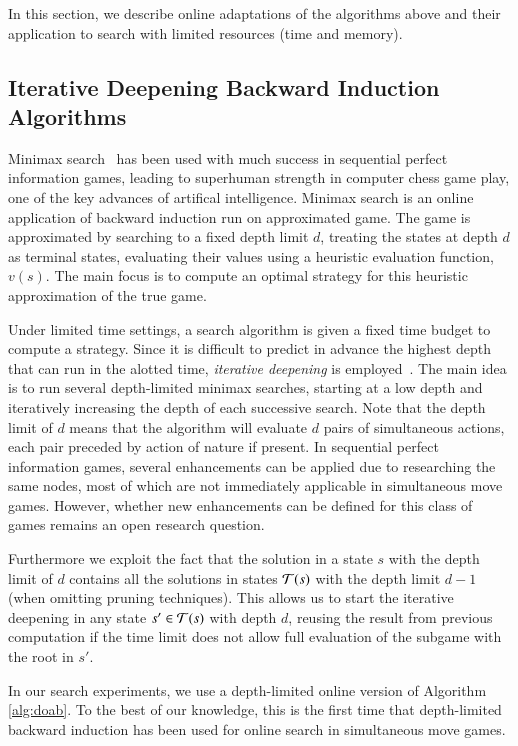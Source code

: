 
In this section, we describe online adaptations of the algorithms above and their application 
to search with limited resources (time and memory). 

\subsection{Iterative Deepening Backward Induction Algorithms} \label{sec:idbi}

Minimax search~\cite{AIbook} has been used with much success in sequential perfect information games, 
leading to superhuman strength in computer chess game play, one of the key advances of artifical 
intelligence. 
Minimax search is an online application of backward induction run on approximated game. 
The game is approximated by searching to a fixed depth limit $d$, treating the states at depth $d$
as terminal states, evaluating their values using a heuristic evaluation function, $v(s)$. 
The main focus is to compute an optimal strategy for this heuristic approximation of the true game. 

Under limited time settings, a search algorithm is given a fixed time budget to compute a strategy. 
Since it is difficult to predict in advance the highest depth that can run in the alotted time, 
{\it iterative deepening} is employed~\cite{Marsland83}. The main idea is to run several depth-limited 
minimax searches, starting at a low depth and iteratively increasing the depth of each successive search. Note that the depth limit of $d$ means that the algorithm will evaluate $d$ pairs of simultaneous actions, each pair preceded by action of nature if present.  
In sequential perfect information games, several enhancements can be applied due to researching the same 
nodes, most of which are not immediately applicable in simultaneous move games. However, whether new 
enhancements can be defined for this class of games remains an open research question. 

Furthermore we exploit the fact that the solution in a state $s$ with the depth limit of $d$ contains all the solutions in states $\mathcal{T}(s)$ with the depth limit $d - 1$ (when omitting pruning techniques). This allows us to start the iterative deepening in any state $s' \in \mathcal{T}(s)$ with depth $d$, reusing the result from previous computation if the time limit does not allow full evaluation of the subgame with the root in $s'$. 

In our search experiments, we use a depth-limited online version of Algorithm \ref{alg:doab}. To the 
best of our knowledge, this is the first time that depth-limited backward induction has been used for 
online search in simultaneous move games. 






